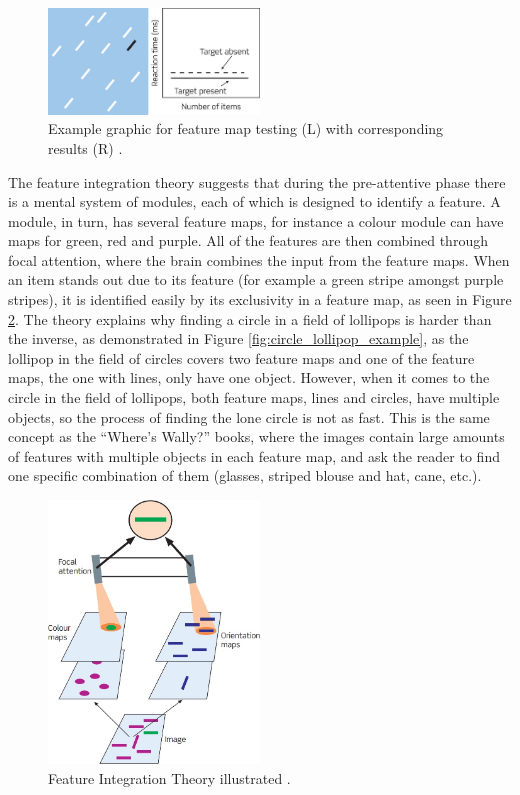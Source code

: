 \begin{figure}[h!]
	\centering
	\includegraphics[width=0.5\textwidth]{figures/Visual_search_paradigm_I.jpg}
	\caption{Example graphic for feature map testing (L) with corresponding results (R) \cite{snowden2012basic}.}\label{fig:visual_search_paradign_i}
\end{figure}

The feature integration theory suggests that during the pre-attentive phase there is a mental system of modules, each of which is designed to identify a feature. A module, in turn, has several feature maps, for instance a colour module can have maps for green, red and purple. All of the features are then combined through focal attention, where the brain combines the input from the feature maps. When an item stands out due to its feature (for example a green stripe amongst purple stripes), it is identified easily by its exclusivity in a feature map, as seen in Figure \ref{fig:feature_integration_theory}. The theory explains why finding a circle in a field of lollipops is harder than the inverse, as demonstrated in Figure \ref{fig:circle_lollipop_example}, as the lollipop in the field of circles covers two feature maps and one of the feature maps, the one with lines, only have one object. However, when it comes to the circle in the field of lollipops, both feature maps, lines and circles, have multiple objects, so the process of finding the lone circle is not as fast. This is the same concept as the “Where’s Wally?” books, where the images contain large amounts of features with multiple objects in each feature map, and ask the reader to find one specific combination of them (glasses, striped blouse and hat, cane, etc.).

\begin{figure}[h!]
	\centering
	\includegraphics[width=0.5\textwidth]{figures/feature_integration_theory.jpg}
	\caption{Feature Integration Theory illustrated \cite{snowden2012basic}.}\label{fig:feature_integration_theory}
\end{figure}

